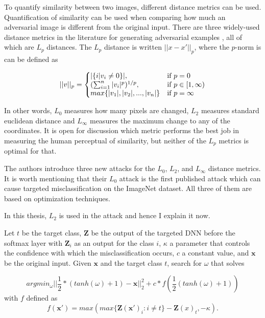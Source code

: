 
To quantify similarity between two images, different distance metrics can be used. Quantification of similarity can be used when comparing how much an adversarial image is different from the original input. There are three widely-used distance metrics in the literature for generating adversarial examples , all of which are $L_p$ distances. The $L_p$ distance is written $||x - x'||_p$, where the $p$-norm is can be defined as

\begin{equation}
  ||v||_p=\left\{
  \begin{array}{@{}ll@{}}
       |\{i | v_i \neq 0 \}|, & \text{if } p = 0 \\
    ( \sum_{i = 1}^{n} |v_i|^p)^{1/p}, & \text{if } p \in [1, \infty) \\
    max\{|v_1|, |v_2|, ..., |v_n|\} & \text{if } p = \infty
  \end{array}\right.
\end{equation} 

In other words, $L_0$ measures how many pixels are changed, $L_2$ measures standard euclidean distance and $L_\infty$ measures the maximum change to any of the coordinates. It is open for discussion which metric performs the best job in measuring the human perceptual of similarity, but neither of the $L_p$ metrics is optimal for that.


The authors \cite{DBLP:journals/corr/CarliniW16a} introduce three new attacks for the $L_0$, $L_2$, and $L_{ \infty }$ distance metrics. It is worth mentioning that their $L_0$ attack is the first published attack which can cause targeted misclassification on the ImageNet dataset. All three of them are based on optimization techniques.

In this thesis, $L_2$ is used in the attack and hence I explain it now.

Let $t$ be the target class, $\pmb Z$ be the output of the targeted DNN before the softmax layer with $\pmb Z_i$ as an output for the class $i$, $\kappa$ a parameter that controls the confidence with which the misclassification occurs, $c$ a constant value, and $\pmb x$ be the original input.
Given $\pmb x$ and the target class $t$, search for $\omega$ that solves

\[
argmin_{\omega} ||\frac{1}{2}*(tanh(\omega) + 1) - \pmb x||_2^2 + c * f(\frac{1}{2}(tanh(\omega) + 1))
\]
with $f$ defined as 
\[
f(\pmb x') = max(max\{\pmb Z(\pmb x ')_i : i \neq t\} - \pmb Z(x)_t, - \kappa).
\]


